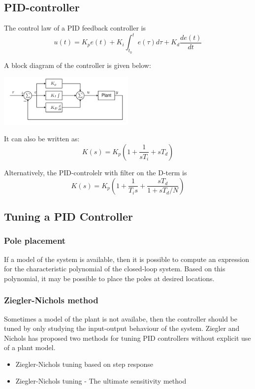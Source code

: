 \subsection{PID-controller}
The control law of a PID feedback controller is
$$u(t) = K_p e(t) + K_i \int_{t_0}^t e(\tau) d\tau + K_d \frac{de(t)}{dt}$$

A block diagram of the controller is given below:
\begin{center}
	\includegraphics[width = 0.5\textwidth]{Images/pid.png}
\end{center}

It can also be written as:
$$K(s)=K_p (1+\frac{1}{sT_i} + sT_d)$$


Alternatively, the PID-controlelr with filter on the D-term is
$$K(s) = K_p \left(1+\frac{1}{T_i s} + \frac{sT_d}{1+sT_d/N}\right)$$

\subsection{Tuning a PID Controller}
\subsubsection{Pole placement}

If a model of the system is available, then it is possible to compute an expression
for the characteristic polynomial of the closed-loop system. Based on this polynomial,
it may be possible to place the poles at desired locations.

\subsubsection{Ziegler-Nichols method}

Sometimes a model of the plant is not availabe, then the controller should be tuned
by only studying the input-output behaviour of the system.
Ziegler and Nichols has proposed two methods for tuning PID controllers without
explicit use of a plant model.

\begin{itemize}
	\item{Ziegler-Nichols tuning based on step response}
	\item{Ziegler-Nichols tuning - The ultimate sensitivity method}
\end{itemize}


